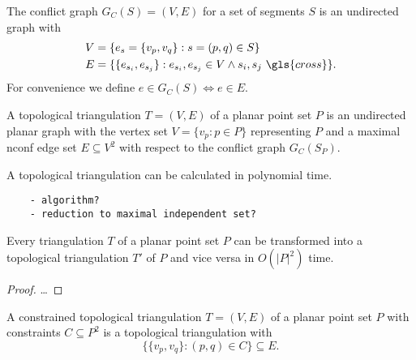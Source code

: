 
\begin{definition}\label{def:conflict_graph}
  The conflict graph \(G_C(S) = (V,E)\) for a set of segments \(S\)
  is an undirected graph with
  \begin{alignat*}{1}
    V &= \{e_s = \{v_p, v_q\} : s = (p,q) \in S\} \\
    E &= \{
      \{e_{s_i}, e_{s_j}\} : 
      e_{s_i}, e_{s_j} \in V 
      \land s_i, s_j~\gls{cross}
    \}.
  \end{alignat*}
  For convenience we define \(e \in G_C(S) \iff e \in E\).
\end{definition}


\begin{definition}
  A topological triangulation \(T=(V,E)\) of a planar point set \(P\)
  is an undirected planar graph with the vertex set
  \( V = \{v_p : p \in P\} \)
  representing \(P\) and a maximal \gls{nconf} edge set
  \(E \subseteq V^2\) with respect to the conflict graph
  \(G_C(S_P)\).
\end{definition}

\begin{theorem}
  A topological triangulation can be calculated in polynomial time.
  \begin{verbatim}
    - algorithm?
    - reduction to maximal independent set?
  \end{verbatim}
\end{theorem}


\begin{theorem}
  Every triangulation \(T\) of a planar point set \(P\) can be
  transformed into a topological triangulation \(T'\) of \(P\)
  and vice versa in \(O(|P|^2)\) time.
\end{theorem}

\begin{proof}
  \ldots{}
\end{proof}


\begin{definition}
  \label{def:constr_top_triangulation}
  A constrained topological triangulation \(T=(V,E)\) of a planar
  point set \(P\) with constraints \(C \subseteq P^2\) is a
  topological triangulation with
  \[
    \{\{v_p,v_q\} : (p,q) \in C\} \subseteq E.
  \]
\end{definition}

